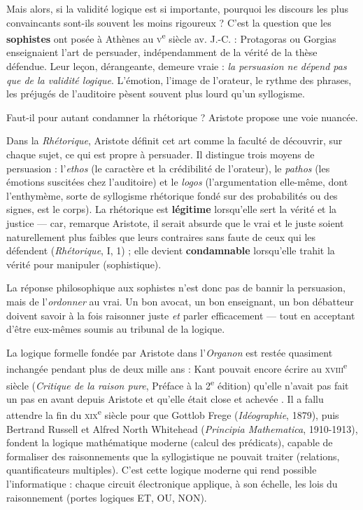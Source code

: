 \documentclass[11pt]{article}
\newcommand{\cle}[1]{{\popxbold\color{popdark}#1}}
\newcounter{popsec}
\newcounter{popsub}
\newcommand{\courssub}[1]{%
  \stepcounter{popsub}%
  \par\vspace{9pt}\noindent{\popxbold\fontsize{11.5}{13}\selectfont\color{popink}{\color{poporange}\thepopsec.\thepopsub}\hspace{6pt}#1}\par\nopagebreak\vspace{4pt}
}
\begin{document}
\courssub{Logique et rhétorique : convaincre et persuader}

Mais alors, si la validité logique est si importante, pourquoi les discours les plus convaincants sont-ils souvent les moins rigoureux ? C'est la question que les \textbf{sophistes} ont posée à Athènes au \textsc{v}\textsuperscript{e} siècle av. J.-C. : Protagoras ou Gorgias enseignaient l'art de persuader, indépendamment de la vérité de la thèse défendue. Leur leçon, dérangeante, demeure vraie : \emph{la persuasion ne dépend pas que de la validité logique}. L'émotion, l'image de l'orateur, le rythme des phrases, les préjugés de l'auditoire pèsent souvent plus lourd qu'un syllogisme.

Faut-il pour autant condamner la rhétorique ? Aristote propose une voie nuancée.

\begin{propriete}
Dans la \emph{Rhétorique}, Aristote définit cet art comme la faculté de découvrir, sur chaque sujet, ce qui est propre à persuader. Il distingue trois moyens de persuasion : l'\emph{ethos} (le caractère et la crédibilité de l'orateur), le \emph{pathos} (les émotions suscitées chez l'auditoire) et le \emph{logos} (l'argumentation elle-même, dont l'\cle{enthymème}, sorte de syllogisme rhétorique fondé sur des probabilités ou des signes, est le corps). La rhétorique est \textbf{légitime} lorsqu'elle sert la vérité et la justice — car, remarque Aristote, il serait absurde que le vrai et le juste soient naturellement plus faibles que leurs contraires sans faute de ceux qui les défendent (\emph{Rhétorique}, I, 1) ; elle devient \textbf{condamnable} lorsqu'elle trahit la vérité pour manipuler (sophistique).
\end{propriete}

La réponse philosophique aux sophistes n'est donc pas de bannir la persuasion, mais de l'\emph{ordonner} au vrai. Un bon avocat, un bon enseignant, un bon débatteur doivent savoir à la fois raisonner juste \emph{et} parler efficacement — tout en acceptant d'être eux-mêmes soumis au tribunal de la logique.

\begin{savaistu}
La logique formelle fondée par Aristote dans l'\emph{Organon} est restée quasiment inchangée pendant plus de deux mille ans : Kant pouvait encore écrire au \textsc{xviii}\textsuperscript{e} siècle (\emph{Critique de la raison pure}, Préface à la 2\textsuperscript{e} édition) qu'elle n'avait pas fait un pas en avant depuis Aristote et qu'elle était \guillemotleft close et achevée \guillemotright. Il a fallu attendre la fin du \textsc{xix}\textsuperscript{e} siècle pour que Gottlob Frege (\emph{Idéographie}, 1879), puis Bertrand Russell et Alfred North Whitehead (\emph{Principia Mathematica}, 1910-1913), fondent la logique mathématique moderne (calcul des prédicats), capable de formaliser des raisonnements que la syllogistique ne pouvait traiter (relations, quantificateurs multiples). C'est cette logique moderne qui rend possible l'informatique : chaque circuit électronique applique, à son échelle, les lois du raisonnement (portes logiques ET, OU, NON).
\end{savaistu}
\end{document}

